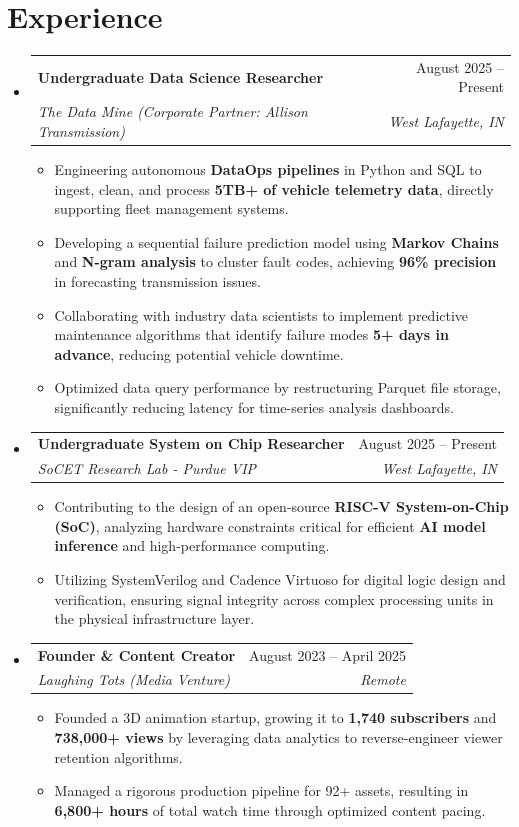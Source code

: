 \documentclass[letterpaper,11pt]{article}
\makeatletter
\newcommand{\resumeItem}[1]{
  \item\small{
    {#1 \vspace{-2pt}}
  }
}
\newcommand{\resumeSubheading}[4]{
  \vspace{-2pt}\item
    \begin{tabular*}{0.97\textwidth}[t]{l@{\extracolsep{\fill}}r}
      \textbf{#1} & #2 \\
      \textit{\small#3} & \textit{\small #4} \\
    \end{tabular*}\vspace{-7pt}
}
\newcommand{\resumeSubHeadingListStart}{\begin{itemize}[leftmargin=0.15in, label={}]}
\newcommand{\resumeSubHeadingListEnd}{\end{itemize}}
\newcommand{\resumeItemListStart}{\begin{itemize}}
\newcommand{\resumeItemListEnd}{\end{itemize}\vspace{-5pt}}
\makeatother
\begin{document}
\section{Experience}
  \resumeSubHeadingListStart
    \resumeSubheading
      {Undergraduate Data Science Researcher}{August 2025 -- Present}
      {The Data Mine (Corporate Partner: Allison Transmission)} {West Lafayette, IN}
      \resumeItemListStart
        \resumeItem{Engineering autonomous \textbf{DataOps pipelines} in Python and SQL to ingest, clean, and process \textbf{5TB+ of vehicle telemetry data}, directly supporting fleet management systems.}
        \resumeItem{Developing a sequential failure prediction model using \textbf{Markov Chains} and \textbf{N-gram analysis} to cluster fault codes, achieving \textbf{96\% precision} in forecasting transmission issues.}
        \resumeItem{Collaborating with industry data scientists to implement predictive maintenance algorithms that identify failure modes \textbf{5+ days in advance}, reducing potential vehicle downtime.}
        \resumeItem{Optimized data query performance by restructuring Parquet file storage, significantly reducing latency for time-series analysis dashboards.}
      \resumeItemListEnd

    \resumeSubheading
      {Undergraduate System on Chip Researcher}{August 2025 -- Present}
      {SoCET Research Lab - Purdue VIP}{West Lafayette, IN}
      \resumeItemListStart
        \resumeItem{Contributing to the design of an open-source \textbf{RISC-V System-on-Chip (SoC)}, analyzing hardware constraints critical for efficient \textbf{AI model inference} and high-performance computing.}
        \resumeItem{Utilizing SystemVerilog and Cadence Virtuoso for digital logic design and verification, ensuring signal integrity across complex processing units in the physical infrastructure layer.}
      \resumeItemListEnd
      
    \resumeSubheading
      {Founder \& Content Creator}{August 2023 -- April 2025}
      {Laughing Tots (Media Venture)}{Remote}
      \resumeItemListStart
        \resumeItem{Founded a 3D animation startup, growing it to \textbf{1,740 subscribers} and \textbf{738,000+ views} by leveraging data analytics to reverse-engineer viewer retention algorithms.}
        \resumeItem{Managed a rigorous production pipeline for 92+ assets, resulting in \textbf{6,800+ hours} of total watch time through optimized content pacing.}
      \resumeItemListEnd

  \resumeSubHeadingListEnd
\end{document}
